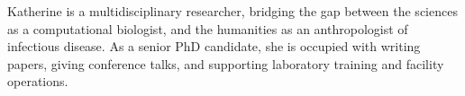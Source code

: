 

\begin{cvparagraph}

Katherine is a multidisciplinary researcher, bridging the gap between the sciences as a computational biologist, and the humanities as an anthropologist of infectious disease. As a senior PhD candidate, she is occupied with writing papers, giving conference talks, and supporting laboratory training and facility operations.
\end{cvparagraph}
